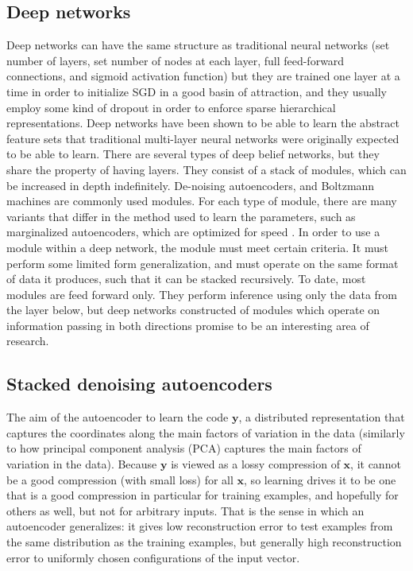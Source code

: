 \documentclass[12pt]{article}
\begin{document}
\begin{doublespacing}
	\subsection{Deep networks}
Deep networks can have the same structure as traditional neural networks (set number of layers, set number of nodes at each layer, full feed-forward connections, and sigmoid activation function) but they are trained one layer at a time in order to initialize SGD in a good basin of attraction, and they usually employ some kind of dropout in order to enforce sparse hierarchical representations\cite{hinton2012improving, krizhevsky2012imagenet}. 
Deep networks have been shown to be able to learn the abstract feature sets that traditional multi-layer neural networks were originally expected to be able to learn. There are several types of deep belief networks, but they share the property of having layers. They consist of a stack of modules, which can be increased in depth indefinitely. De-noising autoencoders, and Boltzmann machines are commonly used modules. 
For each type of module, there are many variants that differ in the method used to learn the parameters, such as marginalized autoencoders, which are optimized for speed \cite{chen2012marginalized}. In order to use a module within a deep network, the module must meet certain criteria. It must perform some limited form generalization, and must operate on the same format of data it produces, such that it can be stacked recursively. To date, most modules are feed forward only. %
They perform inference using only the data from the layer below, but deep networks constructed of modules which operate on information passing in both directions promise to be an interesting area of research.

	\subsection{Stacked denoising autoencoders}
The aim of the autoencoder to learn the code $\mathbf y$, a distributed representation that captures the coordinates along the main factors of variation in the data (similarly to how principal component analysis (PCA) captures the main factors of variation in the data). Because $\mathbf y$ is viewed as a lossy compression of $\mathbf x$, it cannot be a good compression (with small loss) for all $\mathbf x$, so learning drives it to be one that is a good compression in particular for training examples, and hopefully for others as well, but not for arbitrary inputs. That is the sense in which an autoencoder generalizes: it gives low reconstruction error to test examples from the same distribution as the training examples, but generally high reconstruction error to uniformly chosen configurations of the input vector.


\end{doublespacing}
\end{document}
